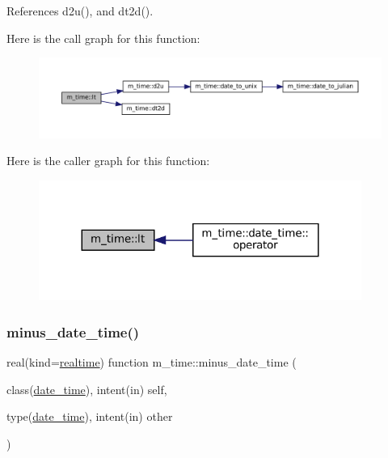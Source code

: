 References d2u(), and dt2d().

Here is the call graph for this function\+:\nopagebreak
\begin{figure}[H]
\begin{center}
\leavevmode
\includegraphics[width=350pt]{namespacem__time_a2cc7f6c40c8ef5aeef08cd51912987d7_cgraph}
\end{center}
\end{figure}
Here is the caller graph for this function\+:\nopagebreak
\begin{figure}[H]
\begin{center}
\leavevmode
\includegraphics[width=299pt]{namespacem__time_a2cc7f6c40c8ef5aeef08cd51912987d7_icgraph}
\end{center}
\end{figure}
\mbox{\label{namespacem__time_ae81a89463c40f33a14b1b2d49f797643}} 
\subsubsection{\texorpdfstring{minus\+\_\+date\+\_\+time()}{minus\_date\_time()}}
{\footnotesize\ttfamily real(kind=\mbox{\hyperlink{namespacem__time_ac10ea9e8d59ec74eaa7d89f2517d7422}{realtime}}) function m\+\_\+time\+::minus\+\_\+date\+\_\+time (\begin{DoxyParamCaption}\item[{class(\mbox{\hyperlink{structm__time_1_1date__time}{date\+\_\+time}}), intent(in)}]{self,  }\item[{type(\mbox{\hyperlink{structm__time_1_1date__time}{date\+\_\+time}}), intent(in)}]{other }\end{DoxyParamCaption})\hspace{0.3cm}{\ttfamily [private]}}



